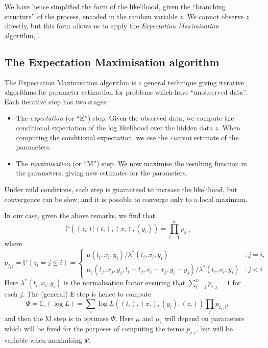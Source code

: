 \documentclass[twoside,a4paper]{article}
\theoremstyle{plain}
\theoremstyle{definition}
\begin{document}
We have hence simplified the form of the likelihood, given the ``branching structure'' of
the process, encoded in the random variable $z$.  We cannot observe $z$ directly, but this form
allows us to apply the \emph{Expectation Maximisation} algorithm, \cite{mk}.


\subsection{The Expectation Maximisation algorithm}\label{app:em}

The Expectation Maximisation algorithm is a general technique giving iterative algorithms
for parameter estimation for problems which have ``unobserved data''.  Each iterative step
has two stages:
\begin{itemize}
\item The \emph{expectation} (or ``E'') step.  Given the observed data, we compute the
conditional expectation of the log likelihood over the hidden data $z$.  When computing the
conditional expectation, we use the \emph{current} estimate of the parameters.
\item The \emph{maximisation} (or ``M'') step.  We now maximise the resulting function
in the parameters, giving new estimates for the parameters.
\end{itemize}
Under mild conditions, each step is guaranteed to increase the likelihood, but convergence
can be slow, and it is possible to converge only to a local maximum.

In our case, given the above remarks, we find that
\[ \mathbb P((z_i) | (t_i),(x_i),(y_i)) = \prod_{i=1}^n p_{j,i} \]
where
\[ p_{j,i} = \mathbb P(z_i=j\leq i) = \begin{cases} \mu(t_i,x_i,y_i) / \lambda^*(t_i,x_i,y_i) &: j=i, \\
\mu_1(t_j,x_j,y_j; t_i-t_j,x_i-x_j,y_i-y_j) / \lambda^*(t_i,x_i,y_i) &: j<i \end{cases} \]
Here $\lambda^*(t_i,x_i,y_i)$ is the normalisation factor ensuring that $\sum_{i=1}^n p_{i,j} = 1$ for
each $j$.  The (general) E step is hence to compute
\begin{equation}
\Psi = \mathbb E_z(\log L) = 
\sum_z \log L((t_i),(x_i),(y_i),(z_i))  \prod_i p_{z_i,i},
\label{eq:factors}
\end{equation}
and then the M step is to optimise $\Psi$.  Here $\mu$ and $\mu_1$ will depend on parameters
which will be fixed for the purposes of computing the terms $p_{j,i}$, but will be
variable when maximising $\Psi$.
\end{document}
